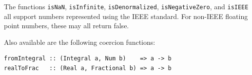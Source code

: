 The functions \mbox{\tt isNaN}, \mbox{\tt isInfinite}, \mbox{\tt isDenormalized},
\mbox{\tt isNegativeZero}, and \mbox{\tt isIEEE} all support numbers represented using
the IEEE standard.  For non-IEEE floating point numbers, these may all
return false.

Also available are the following coercion functions:
\bprog
{\small\begin{verbatim}
fromIntegral :: (Integral a, Num b)    => a -> b
realToFrac   :: (Real a, Fractional b) => a -> b
\end{verbatim}}
\eprogNoSkip{}



